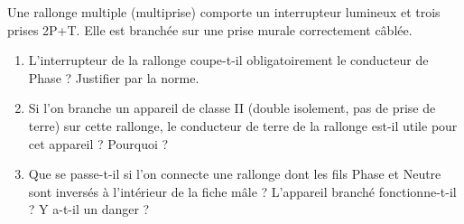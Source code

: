 \documentclass[11pt]{article}
\begin{document}
\begin{exercice}
Une rallonge multiple (multiprise) comporte un interrupteur lumineux et trois prises 2P+T. Elle est branchée sur une prise murale correctement câblée.
\begin{enumerate}
    \item L'interrupteur de la rallonge coupe-t-il obligatoirement le conducteur de Phase ? Justifier par la norme.
    \item Si l'on branche un appareil de classe II (double isolement, pas de prise de terre) sur cette rallonge, le conducteur de terre de la rallonge est-il utile pour cet appareil ? Pourquoi ?
    \item Que se passe-t-il si l'on connecte une rallonge dont les fils Phase et Neutre sont inversés à l'intérieur de la fiche mâle ? L'appareil branché fonctionne-t-il ? Y a-t-il un danger ?
\end{enumerate}
\end{exercice}
\end{document}
